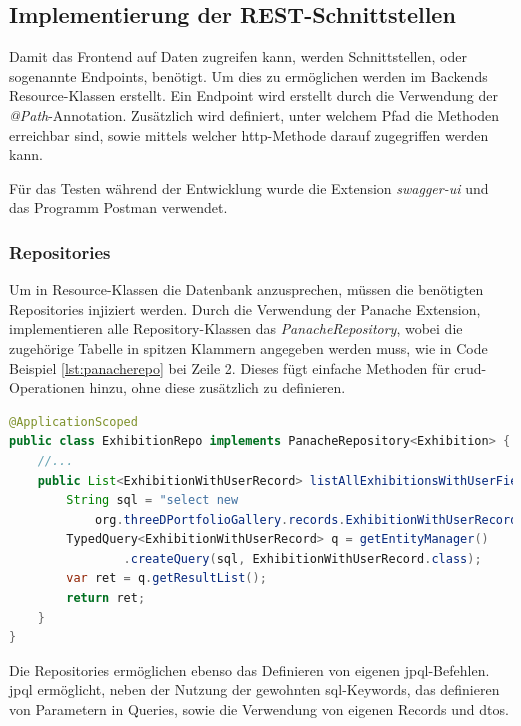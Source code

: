 \subsection{Implementierung der REST-Schnittstellen}

Damit das Frontend auf Daten zugreifen kann, werden Schnittstellen, oder sogenannte Endpoints, benötigt. 
Um dies zu ermöglichen werden im Backends Resource-Klassen erstellt. 
Ein Endpoint wird erstellt durch die Verwendung der \emph{@Path}-Annotation.
Zusätzlich wird definiert, unter welchem Pfad die Methoden erreichbar sind, sowie mittels welcher \gls{http}-Methode darauf zugegriffen werden kann. 

Für das Testen während der Entwicklung wurde die Extension \emph{swagger-ui} und das Programm Postman verwendet.

\subsubsection{Repositories} 
Um in Resource-Klassen die Datenbank anzusprechen, müssen die benötigten Repositories injiziert werden. 
Durch die Verwendung der Panache Extension, implementieren alle Repository-Klassen das \emph{PanacheRepository}, wobei die zugehörige Tabelle in spitzen Klammern angegeben werden muss, wie in Code Beispiel \ref{lst:panacherepo} bei Zeile 2.
Dieses fügt einfache Methoden für \gls{crud}-Operationen hinzu, ohne diese zusätzlich zu definieren. 

\begin{lstlisting}[label=lst:panacherepo, language=Java, caption=Teil aus dem Exhibition Repository]
@ApplicationScoped
public class ExhibitionRepo implements PanacheRepository<Exhibition> {
    //...
    public List<ExhibitionWithUserRecord> listAllExhibitionsWithUserField() {
        String sql = "select new 
            org.threeDPortfolioGallery.records.ExhibitionWithUserRecord(e, u.user_name, u.icon_url) from Exhibition e join e.user u left join e.categories c";
        TypedQuery<ExhibitionWithUserRecord> q = getEntityManager()
                .createQuery(sql, ExhibitionWithUserRecord.class);
        var ret = q.getResultList();
        return ret;
    }
}
\end{lstlisting}

Die Repositories ermöglichen ebenso das Definieren von eigenen \gls{jpql}-Befehlen. 
\gls{jpql} ermöglicht, neben der Nutzung der gewohnten \gls{sql}-Keywords, das definieren von Parametern in Queries, sowie die Verwendung von eigenen Records und \gls{dto}s.

